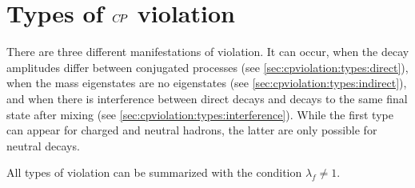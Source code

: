 
\section{Types of \texorpdfstring{${C\!P}$}{CP} violation}
\label{sec:cpviolation:types}

There are three different manifestations of \CP violation. It can occur, when
the decay amplitudes differ between \CP conjugated processes (see
\cref{sec:cpviolation:types:direct}), when the mass eigenstates are no \CP
eigenstates (see \cref{sec:cpviolation:types:indirect}), and when there is
interference between direct decays and decays to the same final state after
mixing (see \cref{sec:cpviolation:types:interference}). While the first type
can appear for charged and neutral hadrons, the latter are only possible for
neutral decays.

All types of \CP violation can be summarized with the condition $\lambda_f
\neq 1$.





